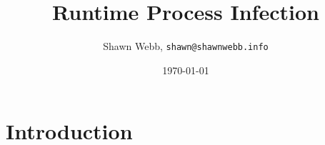\documentclass[twocolumn]{article}
\begin{document}
\title{Runtime Process Infection}
\author{Shawn Webb, \texttt{shawn@shawnwebb.info}}
\date{\today}
\maketitle

\begin{abstract}

\end{abstract}

\section{Introduction}

\end{document}
